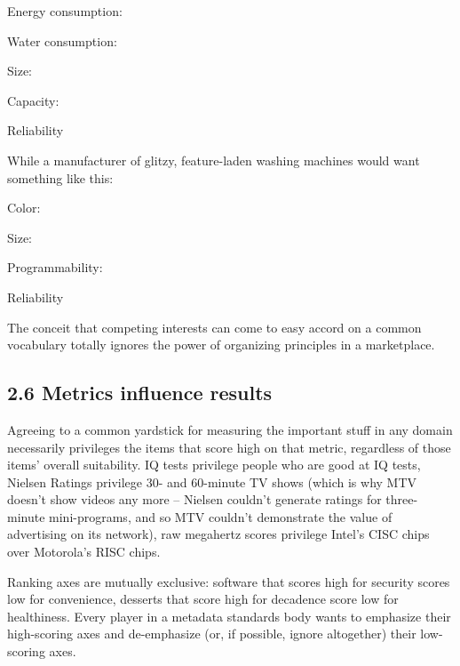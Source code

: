 \medskip
\begin{ibox}{Energy consumption:}
  \begin{ibox}{Water consumption:}
    \begin{ibox}{Size:}
      \begin{ibox}{Capacity:}
        \begin{ibox}{Reliability}
        \end{ibox}
      \end{ibox}
    \end{ibox}
  \end{ibox}
\end{ibox}
\medskip

\noindent
While a manufacturer of glitzy, feature-laden washing machines
would want something like this:

\medskip
\begin{ibox}{Color:}
  \begin{ibox}{Size:}
    \begin{ibox}{Programmability:}
      \begin{ibox}{Reliability}
      \end{ibox}
    \end{ibox}
  \end{ibox}
\end{ibox}
\medskip

The conceit that competing interests can come to easy accord on a
common vocabulary totally ignores the power of organizing
principles in a marketplace.

\subsection{2.6 Metrics influence results}

Agreeing to a common yardstick for measuring the important stuff in
any domain necessarily privileges the items that score high on that
metric, regardless of those items' overall suitability. IQ tests
privilege people who are good at IQ tests, Nielsen Ratings
privilege 30- and 60-minute TV shows (which is why MTV doesn't show
videos any more -- Nielsen couldn't generate ratings for
three-minute mini-programs, and so MTV couldn't demonstrate the
value of advertising on its network), raw megahertz scores
privilege Intel's CISC chips over Motorola's RISC chips.

Ranking axes are mutually exclusive: software that scores high for
security scores low for convenience, desserts that score high for
decadence score low for healthiness. Every player in a metadata
standards body wants to emphasize their high-scoring axes and
de-emphasize (or, if possible, ignore altogether) their low-scoring
axes.

